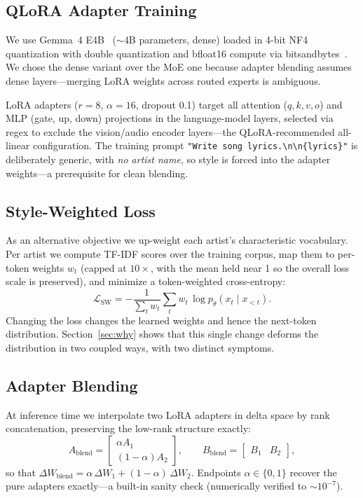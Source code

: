 \documentclass[runningheads]{llncs}
\begin{document}
\subsection{QLoRA Adapter Training}
We use Gemma~4 E4B~\cite{gemma2025} (${\sim}$4B parameters, dense) loaded in 4-bit NF4 quantization with double quantization and bfloat16 compute via bitsandbytes~\cite{dettmers2022llmint8}. We chose the dense variant over the MoE one because adapter blending assumes dense layers---merging LoRA weights across routed experts is ambiguous.

LoRA adapters ($r{=}8$, $\alpha{=}16$, dropout 0.1) target all attention ($q,k,v,o$) and MLP (gate, up, down) projections in the language-model layers, selected via regex to exclude the vision/audio encoder layers---the QLoRA-recommended all-linear configuration. The training prompt \texttt{"Write song lyrics.\textbackslash n\textbackslash n\{lyrics\}"} is deliberately generic, with \emph{no artist name}, so style is forced into the adapter weights---a prerequisite for clean blending.

\subsection{Style-Weighted Loss}
\label{sec:swloss}
As an alternative objective we up-weight each artist's characteristic vocabulary. Per artist we compute TF-IDF scores over the training corpus, map them to per-token weights $w_t$ (capped at $10\times$, with the mean held near 1 so the overall loss scale is preserved), and minimize a token-weighted cross-entropy:
\begin{equation}
    \mathcal{L}_{\text{SW}} = -\frac{1}{\sum_t w_t}\sum_t w_t \, \log p_\theta(x_t \mid x_{<t}).
\end{equation}
Changing the loss changes the learned weights and hence the next-token distribution. Section~\ref{sec:why} shows that this single change deforms the distribution in two coupled ways, with two distinct symptoms.

\subsection{Adapter Blending}
At inference time we interpolate two LoRA adapters in delta space by rank concatenation, preserving the low-rank structure exactly:
\begin{equation}
    A_{\text{blend}}=\begin{bmatrix}\alpha A_{1}\\ (1-\alpha)A_{2}\end{bmatrix},\qquad
    B_{\text{blend}}=\begin{bmatrix}B_{1}&B_{2}\end{bmatrix},
\end{equation}
so that $\Delta W_{\text{blend}} = \alpha\,\Delta W_1 + (1-\alpha)\,\Delta W_2$. Endpoints $\alpha\in\{0,1\}$ recover the pure adapters exactly---a built-in sanity check (numerically verified to $\sim\!10^{-7}$).
\end{document}

